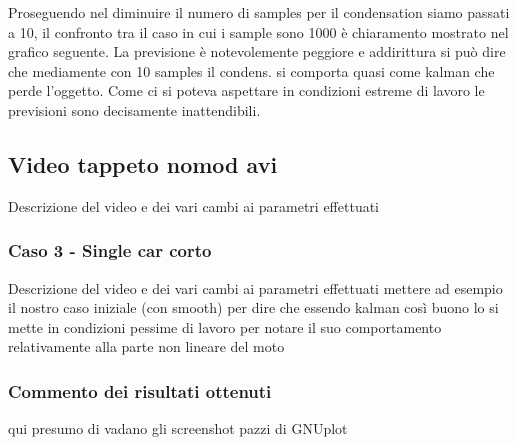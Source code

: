 Proseguendo nel diminuire il numero di samples per il condensation siamo passati a 10, il confronto tra il caso in cui i sample sono 1000 è chiaramento mostrato nel grafico seguente. La previsione è notevolemente peggiore e addirittura si può dire che mediamente con 10 samples il condens. si comporta quasi come kalman  che perde l'oggetto. Come ci si poteva aspettare in condizioni estreme di lavoro le previsioni sono decisamente inattendibili.


\subsection{Video tappeto nomod avi}
Descrizione del video e dei vari cambi ai parametri effettuati

\subsubsection{Caso 3 - Single car corto}
Descrizione del video e dei vari cambi ai parametri effettuati mettere ad esempio il nostro caso iniziale (con smooth) per dire che essendo kalman così buono lo si mette in condizioni pessime di lavoro per notare il suo comportamento relativamente alla parte non lineare del moto

\subsubsection{Commento dei risultati ottenuti}
qui presumo di vadano gli screenshot pazzi di GNUplot

